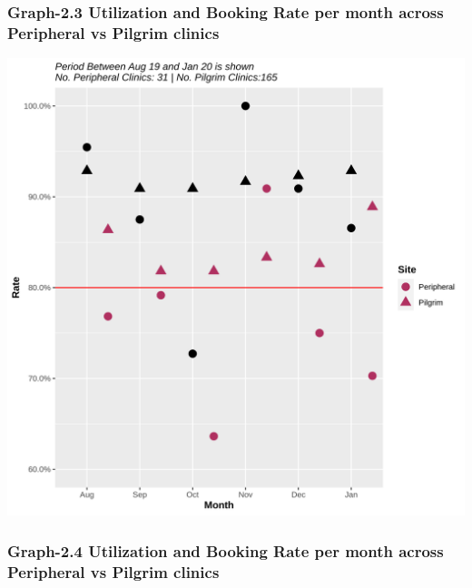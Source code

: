 \documentclass[]{article}
\begin{document}
\hypertarget{graph-2.3-utilization-and-booking-rate-per-month-across-peripheral-vs-pilgrim-clinics}{%
\subsubsection{Graph-2.3 Utilization and Booking Rate per month across
Peripheral vs Pilgrim
clinics}\label{graph-2.3-utilization-and-booking-rate-per-month-across-peripheral-vs-pilgrim-clinics}}

\begin{center}\includegraphics{LF2_files/figure-latex/unnamed-chunk-8-1} \end{center}

\hypertarget{graph-2.4-utilization-and-booking-rate-per-month-across-peripheral-vs-pilgrim-clinics}{%
\subsubsection{Graph-2.4 Utilization and Booking Rate per month across
Peripheral vs Pilgrim
clinics}\label{graph-2.4-utilization-and-booking-rate-per-month-across-peripheral-vs-pilgrim-clinics}}
\end{document}
